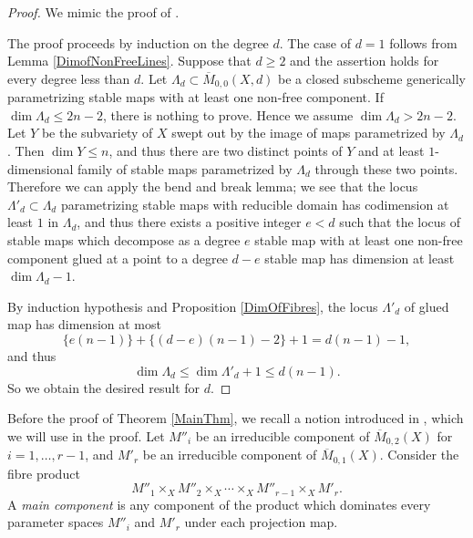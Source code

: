 \documentclass[dvipdfmx, 12pt, a4paper]{amsart}
\theoremstyle{plain}
\theoremstyle{definition}
\theoremstyle{remark}
\newcommand{\ol}{\overline}
\begin{document}
		\begin{proof}
			We mimic the proof of \cite[Theorem 5.1]{BeheshtiRiedl2021linear}.
			
			The proof proceeds by induction on the degree $d$. The case of $d=1$ follows from Lemma \ref{DimofNonFreeLines}. 
			Suppose that $d\geq2$ and the assertion holds for every degree less than $d$. Let $\Lambda_d\subset\ol{M}_{0,0}(X,d)$ be a closed subscheme generically parametrizing stable maps with at least one non-free component. If $\dim\Lambda_d\leq2n-2$, there is nothing to prove. Hence we assume $\dim\Lambda_d>2n-2$. Let $Y$ be the subvariety of $X$ swept out by the image of maps parametrized by $\Lambda_d$. Then $\dim Y\leq n$, and thus there are two distinct points of $Y$ and at least $1$-dimensional family of stable maps parametrized by $\Lambda_d$ through these two points. Therefore we can apply the bend and break lemma; we see that the locus $\Lambda'_d\subset\Lambda_d$ parametrizing stable maps with reducible domain has codimension at least $1$ in $\Lambda_d$, and thus there exists a positive integer $e<d$ such that the locus of stable maps which decompose as a degree $e$ stable map with at least one non-free component glued at a point to a degree $d-e$ stable map has dimension at least $\dim\Lambda_d-1$.
			
			By induction hypothesis and Proposition \ref{DimOfFibres}, the locus $\Lambda'_d$ of glued map has dimension at most
			$$\{e(n-1)\}+\{(d-e)(n-1)-2\}+1=d(n-1)-1,$$
			and thus
			$$\dim\Lambda_d\leq\dim\Lambda'_d+1\leq d(n-1).$$
			So we obtain the desired result for $d$.
		\end{proof}
	
	
	Before the proof of Theorem \ref{MainThm}, we recall a notion introduced in \cite[Definition 5.6]{LT2019GMC}, which we will use in the proof. Let $M''_i$ be an irreducible component of $\ol{M}_{0,2}(X)$ for $i=1,\ldots,r-1$, and $M'_r$ be an irreducible component of $\ol{M}_{0,1}(X)$. Consider the fibre product
	$$M''_1\times_XM''_2\times_X\cdots\times_XM''_{r-1}\times_XM'_r.$$
	A \emph{main component} is any component of the product which dominates every parameter spaces $M''_i$ and $M'_r$ under each projection map.
	
	
	
\end{document}

